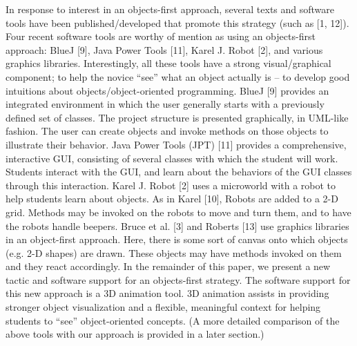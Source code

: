 In response to interest in an objects-first approach, several
texts and software tools have been published/developed that
promote this strategy (such as [1, 12]). Four recent software
tools are worthy of mention as using an objects-first
approach: BlueJ [9], Java Power Tools [11], Karel J. Robot
[2], and various graphics libraries. Interestingly, all these
tools have a strong visual/graphical component; to help the
novice “see” what an object actually is – to develop good
intuitions about objects/object-oriented programming.
BlueJ [9] provides an integrated environment in
which the user generally starts with a previously defined set
of classes. The project structure is presented graphically, in
UML-like fashion. The user can create objects and invoke
methods on those objects to illustrate their behavior. Java
Power Tools (JPT) [11] provides a comprehensive,
interactive GUI, consisting of several classes with which 
the student will work. Students interact with the GUI, and
learn about the behaviors of the GUI classes through this
interaction. Karel J. Robot [2] uses a microworld with a
robot to help students learn about objects. As in Karel [10],
Robots are added to a 2-D grid. Methods may be invoked
on the robots to move and turn them, and to have the robots
handle beepers. Bruce et al. [3] and Roberts [13] use
graphics libraries in an object-first approach. Here, there is
some sort of canvas onto which objects (e.g. 2-D shapes)
are drawn. These objects may have methods invoked on
them and they react accordingly.
In the remainder of this paper, we present a new
tactic and software support for an objects-first strategy. The
software support for this new approach is a 3D animation
tool. 3D animation assists in providing stronger object
visualization and a flexible, meaningful context for helping
students to “see” object-oriented concepts. (A more detailed
comparison of the above tools with our approach is
provided in a later section.) \cite{cooper_teaching_2003}
